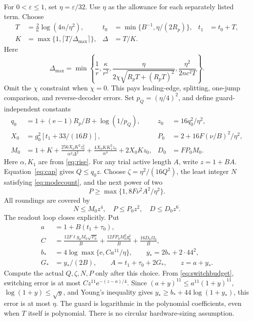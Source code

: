 \documentclass[11pt,a4paper]{article}
\newcommand{\ee}{\mathrm e}
\begin{document}
For $0<\varepsilon\le1$, set $\eta=\varepsilon/32$. Use $\eta$ as the allowance for each separately listed term. Choose
\begin{align}
 T&=\frac2\kappa\log(4n/\eta^2),&
 t_0&=\min\{B^{-1},\eta/(2R_p)\},&t_1&=t_0+T,\\
 K&=\max\{1,\lceil T/\Delta_{\max}\rceil\},&\Delta&=T/K.&&
\end{align}
Here
\begin{equation}
 \Delta_{\max}=\min\left\{\frac1r,\frac\kappa{r^2},
 \frac\eta{2\chi\sqrt{R_pT+(R_pT)^2}},
 \frac{\eta^2}{2nc^2T}\right\}.
\end{equation}
Omit the $\chi$ constraint when $\chi=0$. This pays leading-edge, splitting, one-jump comparison, and reverse-decoder errors. Set $p_Q=(\eta/4)^2$, and define guard-independent constants
\begin{align}
 q_0&=1+(\ee-1)R_p/B+\log(1/p_Q),&z_0&=16q_0^2/\eta^2,\\
 X_0&=g_0^2[t_1+33/(16B)],&P_0&=2+16F(\nu/B)^2/\eta^2,\\
 M_0&=1+K+\frac{256X_0K^2z_0^2}{\alpha^2\Delta^2}
 +\frac{4X_0KK_1^2z_0}{\alpha^4}+2X_0Kz_0,&D_0&=FP_0M_0.
 \label{eq:majorants}
\end{align}
Here $\alpha,K_1$ are from \eqref{eq:rise}. For any trial active length $A$, write $z=1+BA$. Equation~\eqref{eq:cap} gives $Q\le q_0z$. Choose $\zeta=\eta^2/(16Q^2)$, the least integer $N$ satisfying \eqref{eq:modecount}, and the next power of two
\begin{equation}
 P\ge\max\{1,8F\nu^2A^2/\eta^2\}.
 \label{eq:railchoice}
\end{equation}
All roundings are covered by
\begin{equation}
 N\le M_0z^4,\quad P\le P_0z^2,\quad D\le D_0z^6.
\end{equation}
The readout loop closes explicitly. Put
\begin{align}
 a&=1+B(t_1+\tau_0),\\
 C&=\frac{12F\ell g_0M_0\sqrt{P_0}}B
   +\frac{12FP_0M_0^2g_0^2}B+\frac{16D_0\Omega_0}B,\\
 b_*&=4\log\max\{\ee,Ca^{11}/\eta\},\qquad
 y_*=2b_*+2\cdot44^2,\\
 G_*&=y_*/(2B),\qquad A=t_1+\tau_0+2G_*,\qquad z=a+y_*.
 \label{eq:guard}
\end{align}
Compute the actual $Q,\zeta,N,P$ only after this choice. From \eqref{eq:switchbudget}, switching error is at most $Cz^{11}\ee^{-(z-a)/4}$. Since $(a+y)^{11}\le a^{11}(1+y)^{11}$, $\log(1+y)\le\sqrt y$, and Young's inequality gives $y_*\ge b_*+44\log(1+y_*)$, this error is at most $\eta$. The guard is logarithmic in the polynomial coefficients, even when $T$ itself is polynomial. There is no circular hardware-sizing assumption.
\end{document}
